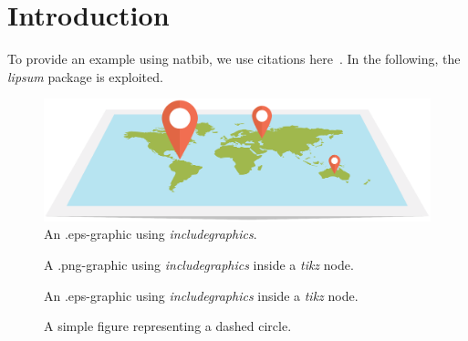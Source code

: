 \section{Introduction}
\label{sec:introduction}

To provide an example using natbib, we use citations here~\cite{Jackson,Moore}.
In the following, the \emph{lipsum} package is exploited.

\lipsum[1-4]

\begin{figure}
    \centering
    \includegraphics[width=0.4\columnwidth]{./figs/flatEarthEPS}
    \caption{An .eps-graphic using \emph{includegraphics}.}
    \label{fig:flatEarthEPS}
\end{figure}

\lipsum[5-6]

\begin{figure}
    \centering
    \caption{A .png-graphic using \emph{includegraphics} inside a \emph{tikz} node.}
 \label{fig:flatEarthPNGinTIKZ}
\end{figure}

\lipsum[7-10]

\begin{figure}
    \centering
    \caption{An .eps-graphic using \emph{includegraphics} inside a \emph{tikz} node.}
 \label{fig:flatEarthEPSinTIKZ}
\end{figure}

\lipsum[11]

\begin{figure}
    \centering
    
    \caption{A simple figure representing a dashed circle.}
    \label{fig:wireCrossSection}
\end{figure}

\lipsum[12]
